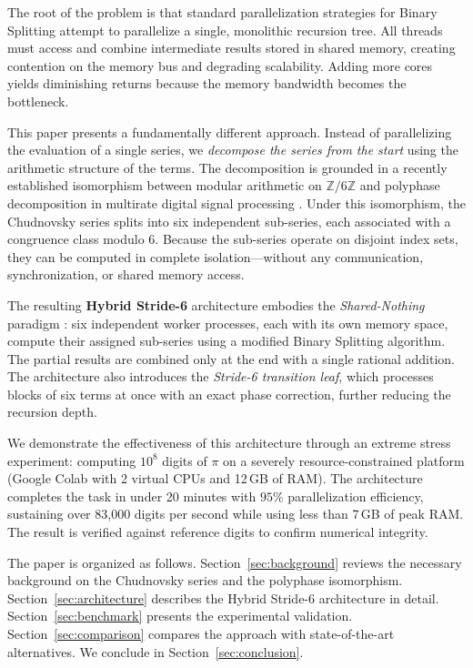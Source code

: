 \documentclass[12pt,a4paper]{article}
\theoremstyle{plain}
\theoremstyle{definition}
\theoremstyle{remark}
\begin{document}
The root of the problem is that standard parallelization strategies for Binary Splitting attempt to parallelize a single, monolithic recursion tree. All threads must access and combine intermediate results stored in shared memory, creating contention on the memory bus and degrading scalability. Adding more cores yields diminishing returns because the memory bandwidth becomes the bottleneck.

This paper presents a fundamentally different approach. Instead of parallelizing the evaluation of a single series, we \emph{decompose the series from the start} using the arithmetic structure of the terms. The decomposition is grounded in a recently established isomorphism between modular arithmetic on \(\mathbb{Z}/6\mathbb{Z}\) and polyphase decomposition in multirate digital signal processing \cite{M2}. Under this isomorphism, the Chudnovsky series splits into six independent sub-series, each associated with a congruence class modulo 6. Because the sub-series operate on disjoint index sets, they can be computed in complete isolation---without any communication, synchronization, or shared memory access.

The resulting \textbf{Hybrid Stride-6} architecture embodies the \emph{Shared-Nothing} paradigm \cite{stonebraker1986case}: six independent worker processes, each with its own memory space, compute their assigned sub-series using a modified Binary Splitting algorithm. The partial results are combined only at the end with a single rational addition. The architecture also introduces the \emph{Stride-6 transition leaf}, which processes blocks of six terms at once with an exact phase correction, further reducing the recursion depth.

We demonstrate the effectiveness of this architecture through an extreme stress experiment: computing \(10^8\) digits of \(\pi\) on a severely resource-constrained platform (Google Colab with 2 virtual CPUs and 12\,GB of RAM). The architecture completes the task in under 20 minutes with \(95\%\) parallelization efficiency, sustaining over 83,000 digits per second while using less than 7\,GB of peak RAM. The result is verified against reference digits to confirm numerical integrity.

The paper is organized as follows. Section~\ref{sec:background} reviews the necessary background on the Chudnovsky series and the polyphase isomorphism. Section~\ref{sec:architecture} describes the Hybrid Stride-6 architecture in detail. Section~\ref{sec:benchmark} presents the experimental validation. Section~\ref{sec:comparison} compares the approach with state-of-the-art alternatives. We conclude in Section~\ref{sec:conclusion}.
\end{document}
